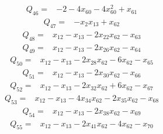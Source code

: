 \begin{equation*}\begin{split}
Q_{46}={}&-2 - 4x_{60} - 4x_{60}^{2} + x_{61}
\end{split}\end{equation*}
\begin{equation*}\begin{split}
Q_{47}={}&-x_{2} x_{13} + x_{62}
\end{split}\end{equation*}
\begin{equation*}\begin{split}
Q_{48}={}&x_{12} - x_{13} - 2x_{22} x_{62} - x_{63}
\end{split}\end{equation*}
\begin{equation*}\begin{split}
Q_{49}={}&x_{12} - x_{13} - 2x_{26} x_{62} - x_{64}
\end{split}\end{equation*}
\begin{equation*}\begin{split}
Q_{50}={}&x_{12} - x_{13} - 2x_{28} x_{62} - 6x_{62} - x_{65}
\end{split}\end{equation*}
\begin{equation*}\begin{split}
Q_{51}={}&x_{12} - x_{13} - 2x_{30} x_{62} - x_{66}
\end{split}\end{equation*}
\begin{equation*}\begin{split}
Q_{52}={}&x_{12} - x_{13} - 2x_{32} x_{62} + 6x_{62} - x_{67}
\end{split}\end{equation*}
\begin{equation*}\begin{split}
Q_{53}={}&x_{12} - x_{13} - 4x_{34} x_{62} - 2x_{35} x_{62} - x_{68}
\end{split}\end{equation*}
\begin{equation*}\begin{split}
Q_{54}={}&x_{12} - x_{13} - 2x_{38} x_{62} - x_{69}
\end{split}\end{equation*}
\begin{equation*}\begin{split}
Q_{55}={}&x_{12} - x_{13} - 2x_{41} x_{62} - 4x_{62} - x_{70}
\end{split}\end{equation*}
